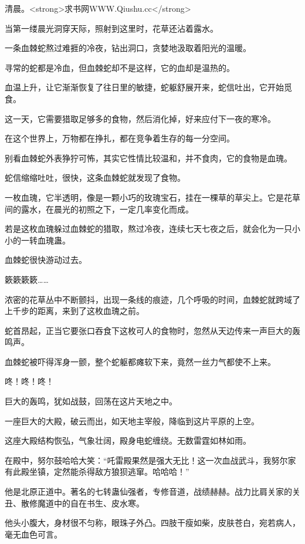 
\begin{this_body}

清晨。<strong>求书网WWW.Qiushu.cc</strong>

当第一缕晨光洞穿天际，照射到这里时，花草还沾着露水。

一条血棘蛇熬过难捱的冷夜，钻出洞口，贪婪地汲取着阳光的温暖。

寻常的蛇都是冷血，但血棘蛇却不是这样，它的血却是温热的。

血温上升，让它渐渐恢复了往日里的敏捷，蛇躯舒展开来，蛇信吐出，它开始觅食。

这一天，它需要猎取足够多的食物，然后消化掉，好来应付下一夜的寒冷。

在这个世界上，万物都在挣扎，都在竞争着生存的每一分空间。

别看血棘蛇外表狰狞可怖，其实它性情比较温和，并不食肉，它的食物是血瑰。

蛇信缩缩吐吐，很快，这条血棘蛇就发现了食物。

一枚血瑰，它半透明，像是一颗小巧的玫瑰宝石，挂在一棵草的草尖上。它是花草间的露水，在晨光的初照之下，一定几率变化而成。

若是这枚血瑰躲过血棘蛇的猎取，熬过冷夜，连续七天七夜之后，就会化为一只小小的一转血瑰蛊。

血棘蛇很快游动过去。

簌簌簌簌……

浓密的花草丛中不断颤抖，出现一条线的痕迹，几个呼吸的时间，血棘蛇就跨域了上千步的距离，来到了这枚血瑰之前。

蛇首昂起，正当它要张口吞食下这枚可人的食物时，忽然从天边传来一声巨大的轰鸣声。

血棘蛇被吓得浑身一颤，整个蛇躯都瘫软下来，竟然一丝力气都使不上来。

咚！咚！咚！

巨大的轰鸣，犹如战鼓，回荡在这片天地之中。

一座巨大的大殿，破云而出，如天地主宰般，降临到这片平原的上空。

这座大殿结构恢弘，气象壮阔，殿身电蛇缠绕。无数雷霆如林如雨。

在殿中，努尔鼓哈哈大笑：“吒雷殿果然是强大无比！这一次血战武斗，我努尔家有此殿坐镇，定然能杀得敌方狼狈逃窜。哈哈哈！”

他是北原正道中。著名的七转蛊仙强者，专修音道，战绩赫赫。战力比肩关家的关丑、散修魔道中的自在书生、皮水寒。

他头小腹大，身材很不匀称，眼珠子外凸。四肢干瘦如柴，皮肤苍白，宛若病人，毫无血色可言。


\end{this_body}
